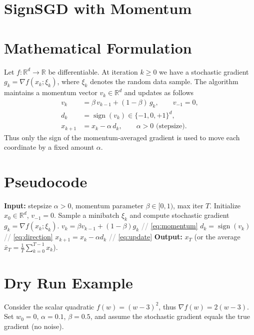 \documentclass{article}
\newcommand{\sign}{\operatorname{sign}}
\newcommand{\R}{\mathbb{R}}
\begin{document}
\section*{SignSGD with Momentum}

\section*{Mathematical Formulation}
Let $f:\R^{d}\rightarrow\R$ be differentiable.  
At iteration $k\ge 0$ we have a stochastic gradient $g_{k}= \nabla f(x_{k};\xi_{k})$, where $\xi_{k}$ denotes the random data sample.  
The algorithm maintains a momentum vector $v_{k}\in\R^{d}$ and updates as follows
\begin{align}
v_{k} &= \beta\,v_{k-1} + (1-\beta)\,g_{k},\qquad v_{-1}=0,\label{eq:momentum}\\[2mm]
d_{k} &= \sign(v_{k})\in\{-1,0,+1\}^{d},\label{eq:direction}\\[2mm]
x_{k+1} &= x_{k} - \alpha\, d_{k}, \qquad \alpha>0 \text{ (stepsize).}\label{eq:update}
\end{align}
Thus only the sign of the momentum‑averaged gradient is used to move each coordinate by a fixed amount $\alpha$.

\section*{Pseudocode}
\begin{algorithm}[H]
\caption{SignSGD with Momentum}
\begin{algorithmic}[1]
\STATE \textbf{Input:} stepsize $\alpha>0$, momentum parameter $\beta\in[0,1)$, max iter $T$.
\STATE Initialize $x_{0}\in\R^{d}$, $v_{-1}=0$.
    \STATE Sample a minibatch $\xi_{k}$ and compute stochastic gradient $g_{k}= \nabla f(x_{k};\xi_{k})$.
    \STATE $v_{k}= \beta v_{k-1} + (1-\beta) g_{k}$ \hfill \textcolor{gray}{// \eqref{eq:momentum}}
    \STATE $d_{k}= \sign(v_{k})$ \hfill \textcolor{gray}{// \eqref{eq:direction}}
    \STATE $x_{k+1}= x_{k} - \alpha d_{k}$ \hfill \textcolor{gray}{// \eqref{eq:update}}
\ENDFOR
\STATE \textbf{Output:} $x_{T}$ (or the average $\bar x_{T}= \frac1T\sum_{k=0}^{T-1}x_{k}$).
\end{algorithmic}
\end{algorithm}

\section*{Dry Run Example}
Consider the scalar quadratic $f(w)=(w-3)^{2}$, thus $\nabla f(w)=2(w-3)$.  
Set $w_{0}=0$, $\alpha=0.1$, $\beta=0.5$, and assume the stochastic gradient equals the true gradient (no noise).
\end{document}
